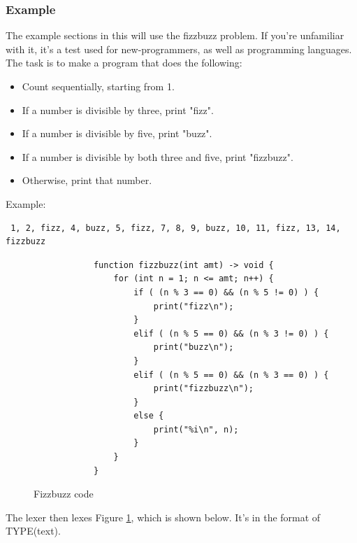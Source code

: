 \documentclass[12pt, letterpaper, oneside]{article}
\begin{document}
	\subsubsection{Example}
	The example sections in this will use the fizzbuzz problem. If you're \newline unfamiliar with it, it's a test used for new-programmers, as well as programming languages. The task is to make a program that does the following:
	\begin{itemize}
		\item[--] Count sequentially, starting from 1.
		\item[--] If a number is divisible by three, print "fizz".
		\item[--] If a number is divisible by five, print "buzz".
		\item[--] If a number is divisible by both three and five, print "fizzbuzz".
		\item[--] Otherwise, print that number.	
	\end{itemize} 
	Example: \begin{verbatim} 1, 2, fizz, 4, buzz, 5, fizz, 7, 8, 9, buzz, 10, 11, fizz, 13, 14, fizzbuzz \end{verbatim}
	\begin{figure}[h]
		\begin{verbatim}
			function fizzbuzz(int amt) -> void {
				for (int n = 1; n <= amt; n++) {
					if ( (n % 3 == 0) && (n % 5 != 0) ) {
						print("fizz\n");
					}
					elif ( (n % 5 == 0) && (n % 3 != 0) ) {
						print("buzz\n");
					}
					elif ( (n % 5 == 0) && (n % 3 == 0) ) {
						print("fizzbuzz\n");
					}
					else {
						print("%i\n", n);
					}
				}
			}
		\end{verbatim}
		\caption{Fizzbuzz code}
		\label{fig:fizzbuzzCode}
	\end{figure} 
	\newpage 
	The lexer then lexes Figure \ref{fig:fizzbuzzCode}, which is shown below. It's in the format of TYPE(text).
\end{document}
